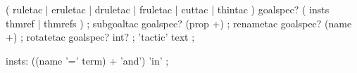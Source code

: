 





\begin{rail}
  ( ruletac | eruletac | druletac | fruletac | cuttac | thintac ) goalspec?
  ( insts thmref | thmrefs )
  ;
  subgoaltac goalspec? (prop +)
  ;
  renametac goalspec? (name +)
  ;
  rotatetac goalspec? int?
  ;
  'tactic' text
  ;

  insts: ((name '=' term) + 'and') 'in'
  ;
\end{rail}

